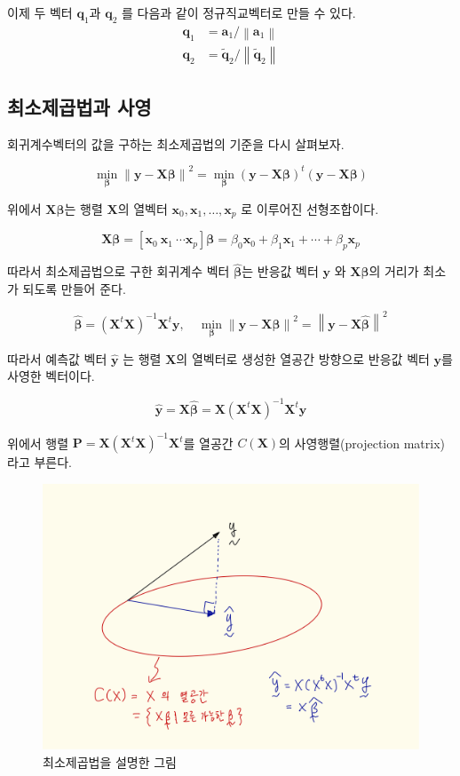 \documentclass[
]{book}
\newcommand{\norm}[1]{\left\lVert#1\right\rVert}
\theoremstyle{definition}
\theoremstyle{definition}
\theoremstyle{definition}
\theoremstyle{remark}
\begin{document}
이제 두 벡터 \(\bm q_1\)과 \(\bm q_2\) 를 다음과 같이 정규직교벡터로 만들 수 있다.
\begin{align*}
\bm q_1 & =  \bm a_1 / \norm{\bm a_1 } \\
\bm q_2 & =  \tilde {\bm q}_2 / \norm{\tilde {\bm q}_2}
\end{align*}

\hypertarget{uxcd5cuxc18cuxc81cuxacf1uxbc95uxacfc-uxc0acuxc601}{%
\subsection{최소제곱법과 사영}\label{uxcd5cuxc18cuxc81cuxacf1uxbc95uxacfc-uxc0acuxc601}}

회귀계수벡터의 값을 구하는 최소제곱법의 기준을 다시 살펴보자.

\[   \min_{\bm \beta } \norm{\bm y -  \bm X \bm \beta }^2= \min_{\bm \beta } ( \bm y -  \bm X \bm \beta )^t( \bm y -  \bm X \bm \beta )  \]

위에서 \(\bm X \bm \beta\)는 행렬 \(\bm X\)의 열벡터 \(\bm x_0, \bm x_1, \dots, \bm x_p\) 로 이루어진 선형조합이다.

\[ \bm X \bm \beta = [\bm x_0~\bm x_1~ \cdots \bm x_p]\bm \beta
 = \beta_0 \bm x_0  + \beta_1 \bm x_1 + \cdots + \beta_p \bm x_p \]

따라서 최소제곱법으로 구한 회귀계수 벡터 \(\hat {\bm \beta}\)는 반응값 벡터 \(\bm y\) 와 \(\bm X {\bm \beta}\)의 거리가 최소가 되도록 만들어 준다.

\[ \hat {\bm \beta} = (\bm X^t \bm X)^{-1} \bm X^t \bm y, \quad 
 \min_{\bm \beta } \norm{\bm y -  \bm X \bm \beta }^2 = \norm{\bm y -  \bm X \hat {\bm \beta} }^2
 \]

따라서 예측값 벡터 \(\hat {\bm y}\) 는 행렬 \(\bm X\)의 열벡터로 생성한 열공간 방향으로 반응값 벡터 \(\bm y\)를 사영한 벡터이다.

\[ \hat {\bm y} = \bm X \hat {\bm \beta} = \bm  X(\bm X^t \bm X)^{-1} \bm X^t \bm y \]

위에서 행렬 \(\bm P = \bm X(\bm X^t \bm X)^{-1} \bm X^t\)를 열공간 \(C(\bm X)\)의 사영행렬(projection matrix)라고 부른다.

\begin{figure}
\centering
\includegraphics{proj2.png}
\caption{최소제곱법을 설명한 그림}
\end{figure}
\end{document}
